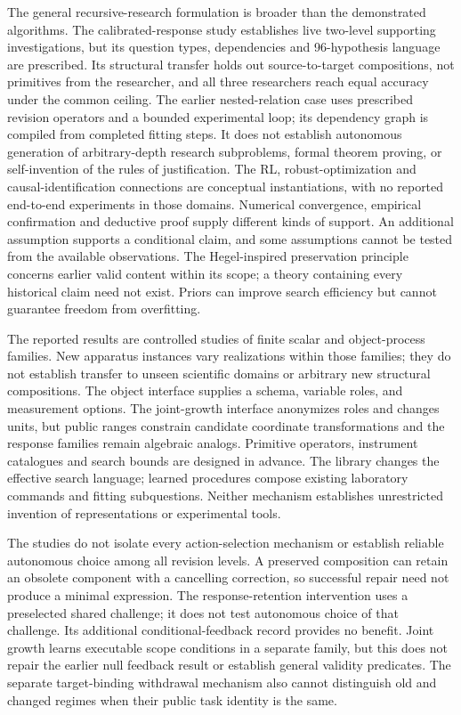 \documentclass[11pt,a4paper]{article}
\begin{document}
The general recursive-research formulation is broader than the demonstrated algorithms. The calibrated-response study establishes live two-level supporting investigations, but its question types, dependencies and 96-hypothesis language are prescribed. Its structural transfer holds out source-to-target compositions, not primitives from the researcher, and all three researchers reach equal accuracy under the common ceiling. The earlier nested-relation case uses prescribed revision operators and a bounded experimental loop; its dependency graph is compiled from completed fitting steps. It does not establish autonomous generation of arbitrary-depth research subproblems, formal theorem proving, or self-invention of the rules of justification. The RL, robust-optimization and causal-identification connections are conceptual instantiations, with no reported end-to-end experiments in those domains. Numerical convergence, empirical confirmation and deductive proof supply different kinds of support. An additional assumption supports a conditional claim, and some assumptions cannot be tested from the available observations. The Hegel-inspired preservation principle concerns earlier valid content within its scope; a theory containing every historical claim need not exist. Priors can improve search efficiency but cannot guarantee freedom from overfitting.


The reported results are controlled studies of finite scalar and object-process
families. New apparatus instances vary realizations within those families;
they do not establish transfer to unseen scientific domains or arbitrary new
structural compositions. The object interface supplies a schema, variable roles,
and measurement options. The joint-growth interface anonymizes roles and changes
units, but public ranges constrain candidate coordinate transformations and the
response families remain algebraic analogs. Primitive operators, instrument
catalogues and search bounds are designed in advance. The library changes the
effective search language; learned procedures compose existing laboratory
commands and fitting subquestions. Neither mechanism establishes unrestricted
invention of representations or experimental tools.


The studies do not isolate every action-selection mechanism or establish reliable
autonomous choice among all revision levels. A preserved composition can retain
an obsolete component with a cancelling correction, so successful repair need
not produce a minimal expression. The response-retention intervention uses a
preselected shared challenge; it does not test autonomous choice of that challenge.
Its additional conditional-feedback record provides no benefit. Joint growth
learns executable scope conditions in a separate family, but this does not repair
the earlier null feedback result or establish general validity predicates. The
separate target-binding withdrawal mechanism also cannot distinguish old and
changed regimes when their public task identity is the same.
\end{document}
